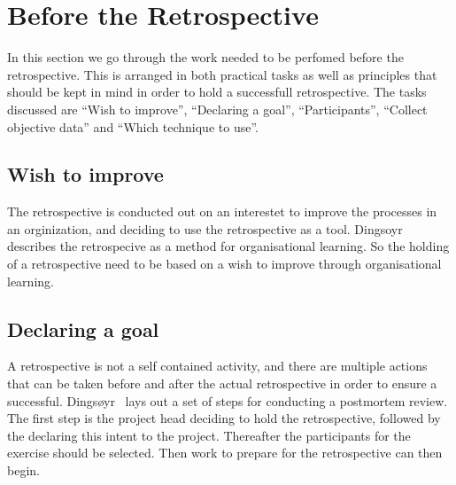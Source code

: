 \documentclass[12pt]{article}
\begin{document}
\section{Before the Retrospective}
In this section we go through the work needed to be perfomed before the retrospective. This is arranged in both practical tasks as well as principles that should be kept in mind in order to hold a successfull retrospective. The tasks discussed are ``Wish to improve'', ``Declaring a goal'', ``Participants'', ``Collect objective data'' and ``Which technique to use''. 

\subsection{Wish to improve}
The retrospective is conducted out on an interestet to improve the processes in an orginization, and deciding to use the retrospective as a tool. Dingsoyr~\cite{Dingsoyr2005} describes the retrospecive as a method for organisational learning. So the holding of a retrospective need to be based on a wish to improve through organisational learning. 

\subsection{Declaring a goal}
A retrospective is not a self contained activity, and there are multiple actions that can be taken before and after the actual retrospective in order to ensure a successful. Dingsøyr~\cite{Dingsoyr2005} lays out a set of steps for conducting a postmortem review. The first step is the project head deciding to hold the retrospective, followed by the declaring this intent to the project. Thereafter the participants for the exercise should be selected. Then work to prepare for the retrospective can then begin.
\end{document}
